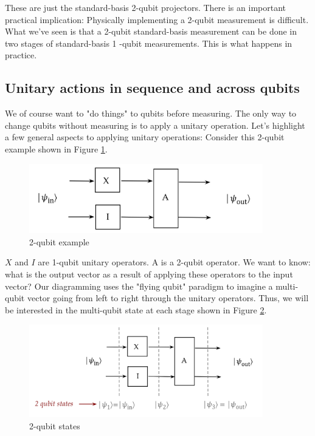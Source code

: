 \documentclass[main.tex]{subfiles}
\begin{document}
    These are just the standard-basis 2-qubit projectors. There is an important practical implication: Physically implementing a 2-qubit measurement is difficult. What we've seen is that a 2-qubit standard-basis measurement can be done in two stages of standard-basis 1 -qubit measurements. This is what happens in practice.

\subsection{Unitary actions in sequence and across qubits}

    We of course want to "do things" to qubits before measuring. The only way to change qubits without measuring is to apply a unitary operation. Let's highlight a few general aspects to applying unitary operations: Consider this 2-qubit example shown in Figure \ref{fig:09measure8}.
    
    \begin{figure}
        \centering
        \includegraphics[width=4in]{notes/figs/n07/10unitary1.png}
        \caption{2-qubit example}
        \label{fig:09measure8}
    \end{figure}
    
    $X$ and $I$ are 1-qubit unitary operators. A is a 2-qubit operator. We want to know: what is the output vector as a result of applying these operators to the input vector? Our diagramming uses the "flying qubit" paradigm to imagine a multi-qubit vector going from left to right through the unitary operators. Thus, we will be interested in the multi-qubit state at each stage shown in Figure \ref{fig:11unitary2}.

    \begin{figure}
        \centering
        \includegraphics[width=4in]{notes/figs/n07/11unitary2.png}
        \caption{2-qubit states}
        \label{fig:11unitary2}
    \end{figure}
\end{document}
